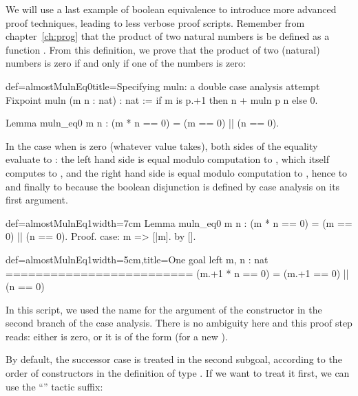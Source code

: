 We will use a last example of boolean equivalence to introduce more
advanced proof techniques, leading to less verbose proof
scripts. Remember from chapter~\ref{ch:prog} that the product of two
natural numbers is be defined as a function
. From this definition, we prove that
the product of two (natural) numbers is zero if and only if one of the
numbers is zero:

\begin{coq}{def=almostMulnEq0}{title=Specifying muln: a double case analysis attempt}
Fixpoint muln (m n : nat) : nat :=
  if m is p.+1 then n + muln p n else 0.

Lemma muln_eq0 m n : (m * n == 0) = (m == 0) || (n == 0).
\end{coq}
In the case when  is zero (whatever value  takes), both
sides of the equality evaluate to : the left hand side is
equal modulo computation to , which itself computes to
, and the right hand side is equal modulo computation to
, hence to  and finally to
 because the boolean disjunction \C{(_ || _)} is defined by
case analysis on its first argument.

\begin{coq}{def=almostMulnEq1}{width=7cm}
Lemma muln_eq0 m n :
  (m * n == 0) = (m == 0) || (n == 0).
Proof.
case: m => [|m].
  by [].
\end{coq}
\begin{coqout}{def=almostMulnEq1}{width=5cm,title=One goal left}
m, n : nat
=========================
(m.+1 * n == 0) =
  (m.+1 == 0) || (n == 0)
\end{coqout}
In this script, we used the name  for the argument of the
constructor in the second branch of the case analysis. There is no
ambiguity here and this proof step reads: either  is zero, or it
is of the form  (for a new ).

By default, the successor case is treated in the second subgoal,
according to the order of constructors in the definition of type
. If we want to treat it first, we can use the ``'' tactic suffix:

